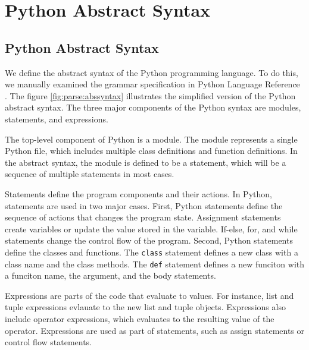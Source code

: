 \section{Python Abstract Syntax}\label{sec:pysyn}
\subsection{Python Abstract Syntax}

We define the abstract syntax of the Python programming language.
To do this, we manually examined the grammar specification in 
Python Language Reference \cite{pythonref}.
The figure \ref{fig:parse:abssyntax} 
illustrates the simplified version of the Python abstract syntax.
The three major components of the Python syntax are modules, statements, and
expressions.

The top-level component of Python is a module.
The module represents a single Python file, which includes multiple
class definitions and function definitions.
In the abstract syntax, the module is defined to be a statement,
which will be a sequence of multiple statements in most cases.

Statements define the program components and their actions. 
In Python, statements are used in two major cases.
First, Python statements define the sequence of actions that changes the
program state. Assignment statements create variables or update the
value stored in the variable. If-else, for, and while statements change
the control flow of the program.
Second, Python statements define the classes and functions.
The {\tt class} statement defines a new class with a class name and the
class methods. 
The {\tt def} statement defines a new funciton with a funciton name, the 
argument, and the body statements.

Expressions are parts of the code that evaluate to values.
For instance, list and tuple expressions evlauate to the new list and tuple
objects. Expressions also include operator expressions, which evaluates to
the resulting value of the operator.
Expressions are used as part of statements, such as assign statements or
control flow statements.

